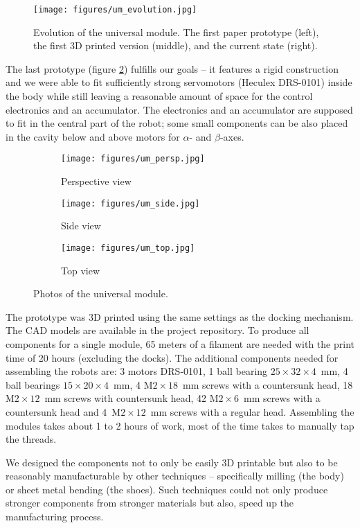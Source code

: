 \begin{figure}[!t]
    \centering
    \texttt{[image: figures/um\_evolution.jpg]}
    \caption{Evolution of the universal module. The first paper prototype
    (left), the first 3D printed version (middle), and the current state
    (right).}
    \label{fig:um_evolution}
\end{figure}

The last prototype (figure \ref{fig:um_photos}) fulfills our goals -- it
features a rigid construction and we were able to fit sufficiently strong
servomotors (Heculex DRS-0101) inside the body while still leaving a reasonable
amount of space for the control electronics and an accumulator. The electronics
and an accumulator are supposed to fit in the central part of the robot; some
small components can be also placed in the cavity below and above motors for
$\alpha$- and $\beta$-axes.

\begin{figure}[!t]
    \centering
    \begin{subfigure}[b]{\textwidth}
        \texttt{[image: figures/um\_persp.jpg]}
        \caption{Perspective view}
    \end{subfigure}

    \begin{subfigure}[b]{\textwidth}
        \texttt{[image: figures/um\_side.jpg]}
        \caption{Side view}
    \end{subfigure}

    \begin{subfigure}[b]{\textwidth}
        \texttt{[image: figures/um\_top.jpg]}
        \caption{Top view}
    \end{subfigure}

    \caption{Photos of the universal module.}
    \label{fig:um_photos}
\end{figure}

The prototype was 3D printed using the same settings as the docking mechanism.
The CAD models are available in the project repository. To produce all
components for a single module, 65 meters of a filament are needed with the
print time of 20 hours (excluding the docks). The additional components needed
for assembling the robots are: 3 motors DRS-0101, 1 ball bearing
$25\times32\times4$~mm, 4 ball bearings $15\times20\times4$~mm, 4
M$2\times18$~mm screws with a countersunk head, 18 M$2\times12$~mm screws with
countersunk head, 42 M$2\times6$~mm screws with a countersunk head and
4~M$2\times12$~mm screws with a regular head. Assembling the modules takes about
1 to 2 hours of work, most of the time takes to manually tap the threads.

We designed the components not to only be easily 3D printable but also to be
reasonably manufacturable by other techniques -- specifically milling (the body)
or sheet metal bending (the shoes). Such techniques could not only produce
stronger components from stronger materials but also, speed up the
manufacturing process.
